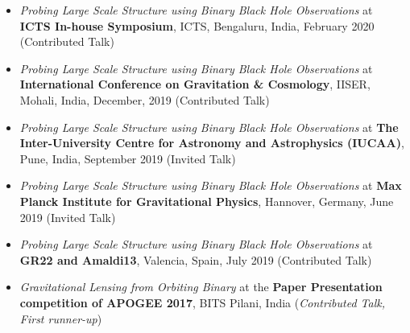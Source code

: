 \begin{itemize}[leftmargin=*]
			\item \textit{Probing Large Scale Structure using Binary Black Hole Observations} at \textbf{ICTS In-house Symposium}, ICTS, Bengaluru, India, February 2020 (Contributed Talk)
			\item \textit{Probing Large Scale Structure using Binary Black Hole Observations} at \textbf{International Conference on Gravitation \& Cosmology}, IISER, Mohali, India, December, 2019 (Contributed Talk)
			\item \textit{Probing Large Scale Structure using Binary Black Hole Observations} at \textbf{The Inter-University Centre for Astronomy and Astrophysics (IUCAA)}, Pune, India, September 2019 (Invited Talk)
			\item \textit{Probing Large Scale Structure using Binary Black Hole Observations} at \textbf{Max Planck Institute for Gravitational Physics}, Hannover, Germany, June 2019 (Invited Talk)
			\item \textit{Probing Large Scale Structure using Binary Black Hole Observations} at \textbf{GR22 and Amaldi13}, Valencia, Spain, July 2019 (Contributed Talk)
			\item \textit{Gravitational Lensing from Orbiting Binary} at the \textbf{Paper Presentation competition of APOGEE 2017}, BITS Pilani, India (\textit{Contributed Talk, First runner-up})
			
		\end{itemize}
		
